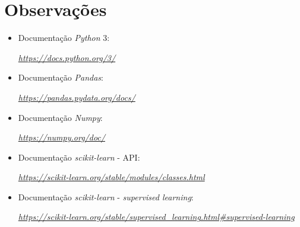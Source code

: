 \documentclass[a4paper]{report}
\begin{document}
\appendix
\chapter{Observações} \label{ch:Observations}
\begin{itemize}
    \item Documentação \textit{Python} 3:
	\par \textit{\url{https://docs.python.org/3/}}
	\item Documentação \textit{Pandas}:
	\par \textit{\url{https://pandas.pydata.org/docs/}}
	\item Documentação \textit{Numpy}:
	\par \textit{\url{https://numpy.org/doc/}}
	\item Documentação \textit{scikit-learn} - API:
    \par \textit{\url{https://scikit-learn.org/stable/modules/classes.html}}
	\item Documentação \textit{scikit-learn} - \textit{supervised learning}:
	\sloppy
	\par \textit{\url{https://scikit-learn.org/stable/supervised_learning.html\#supervised-learning}}
\end{itemize}
\end{document}
